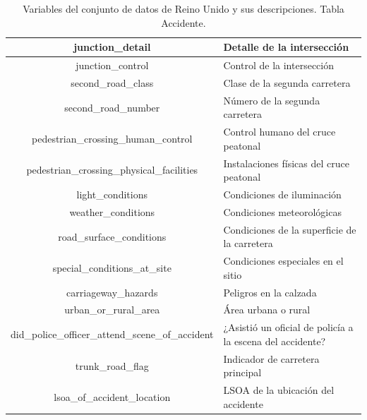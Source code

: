 \documentclass{uathesis-es}
\begin{document}
{\begin{table}[H]
\begin{center}
\begin{tabular}{|c|l|}
            junction\_detail & Detalle de la intersección \\ \hline
            junction\_control & Control de la intersección \\ \hline
            second\_road\_class & Clase de la segunda carretera \\ \hline
            second\_road\_number & Número de la segunda carretera \\ \hline
            pedestrian\_crossing\_human\_control & Control humano del cruce peatonal \\ \hline
            pedestrian\_crossing\_physical\_facilities & Instalaciones físicas del cruce peatonal \\ \hline
            light\_conditions & Condiciones de iluminación \\ \hline
            weather\_conditions & Condiciones meteorológicas \\ \hline
            road\_surface\_conditions & Condiciones de la superficie de la carretera \\ \hline
            special\_conditions\_at\_site & Condiciones especiales en el sitio \\ \hline
            carriageway\_hazards & Peligros en la calzada \\ \hline
            urban\_or\_rural\_area & Área urbana o rural \\ \hline
            did\_police\_officer\_attend\_scene\_of\_accident & ¿Asistió un oficial de policía a la escena del accidente? \\ \hline
            trunk\_road\_flag & Indicador de carretera principal \\ \hline
            lsoa\_of\_accident\_location & LSOA de la ubicación del accidente \\ \hline
        \end{tabular}
    \end{center}
    \caption{Variables del conjunto de datos de Reino Unido y sus descripciones. Tabla Accidente.}
    \label{UK_ACCIDENT_TABLE}
\end{table} 

}
\end{document}
